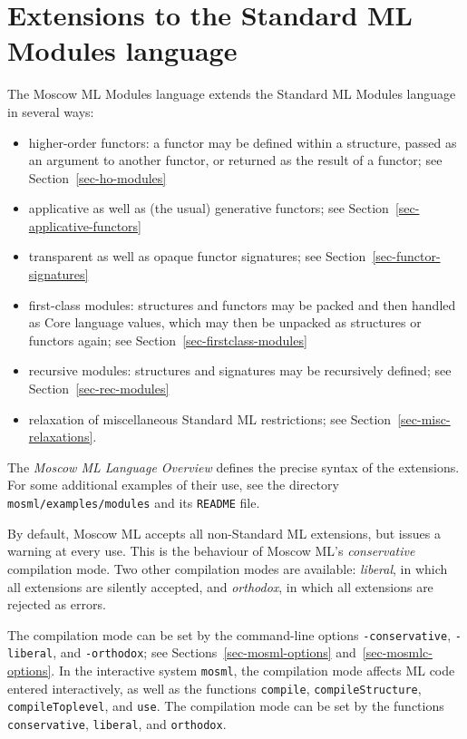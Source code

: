 \documentclass[fleqn,a4paper]{article}
\begin{document}
\newpage
\section{Extensions to the Standard ML Modules language}
\label{sec-modules-extensions}

The Moscow ML Modules language extends the Standard ML Modules
language in several ways:

\begin{itemize}
\item higher-order functors: a functor may be defined within
  a structure, passed as an argument to another functor, 
  or returned as the result
  of a functor; see Section~\ref{sec-ho-modules}
\item applicative as well as (the usual) generative functors; see
   Section~\ref{sec-applicative-functors}
\item transparent as well as opaque functor signatures; see
    Section~\ref{sec-functor-signatures}
\item first-class modules: structures and functors may be packed and
  then handled as Core language values, which may then be unpacked as
  structures or functors again; see
  Section~\ref{sec-firstclass-modules}
\item recursive modules:  structures and signatures may be recursively
  defined; see Section~\ref{sec-rec-modules}
\item relaxation of miscellaneous Standard ML restrictions;
 see Section~\ref{sec-misc-relaxations}.
\end{itemize}

\noindent 
The \emph{Moscow ML Language Overview} defines the precise syntax of
the extensions.
For some additional examples of their use, see the directory {\tt
mosml/examples/modules} and its {\tt README} file.

By default, Moscow ML accepts all non-Standard ML extensions, but
issues a warning at every use.  This is the behaviour of Moscow ML's 
\emph{conservative} compilation mode.  Two other compilation modes are available:
\emph{liberal}, in which all extensions are silently accepted, and
\emph{orthodox}, in which all extensions are rejected as errors.

The compilation mode can be set by the command-line options
\texttt{-conservative}, \texttt{-liberal}, and \texttt{-orthodox}; see
Sections~\ref{sec-mosml-options} and~\ref{sec-mosmlc-options}.
In the interactive system \texttt{mosml}, the compilation mode affects
ML code entered interactively, as well as the functions
\texttt{compile}, \texttt{compileStructure}, \texttt{compileToplevel},
and \texttt{use}.  The compilation mode can be set by the functions
\texttt{conservative}, \texttt{liberal}, and \texttt{orthodox}.
\end{document}

